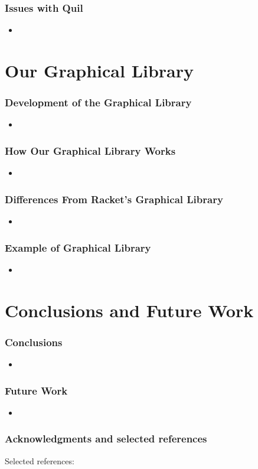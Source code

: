 \documentclass{beamer}
\begin{document}
\begin{frame}
\frametitle{Issues with Quil}
\begin{itemize}
\item
\end{itemize}
\end{frame}

\section{Our Graphical Library}

\begin{frame}
\frametitle{Development of the Graphical Library}
\begin{itemize}
\item
\end{itemize}
\end{frame}


\begin{frame}
\frametitle{How Our Graphical Library Works}
\begin{itemize}
\item
\end{itemize}
\end{frame}


\begin{frame}
\frametitle{Differences From Racket's Graphical Library}
\begin{itemize}
\item
\end{itemize}
\end{frame}

\begin{frame}
\frametitle{Example of Graphical Library}
\begin{itemize}
\item
\end{itemize}
\end{frame}


\section{Conclusions and Future Work}

\begin{frame}
\frametitle{Conclusions}
\begin{itemize}
\item
\end{itemize}
\end{frame}

\begin{frame}
\frametitle{Future Work}
\begin{itemize}
\item
\end{itemize}
\end{frame}

\begin{frame}
\frametitle{Acknowledgments and selected references}
Selected references:
\end{frame}
\end{document}
